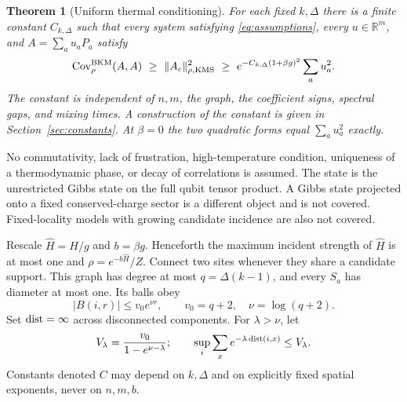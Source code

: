\documentclass[11pt]{article}
\newtheorem{theorem}{Theorem}[section]
\theoremstyle{remark}\newtheorem{remark}[theorem]{Remark}
\newcommand{\kn}[1]{\|#1\|_{\rho,\mathrm{KMS}}}
\newcommand{\R}{\mathbb R}\newcommand{\C}{\mathbb C}
\begin{document}
\begin{theorem}[Uniform thermal conditioning]\label{thm:main}
For each fixed $k,\Delta$ there is a finite constant $C_{k,\Delta}$ such that every system satisfying \eqref{eq:assumptions}, every $u\in\R^m$, and $A=\sum_a u_aP_a$ satisfy
\begin{equation}\label{eq:main}
 \Cov_\rho^{\mathrm{BKM}}(A,A)
 \ \ge\ \kn{A_c}^2
 \ \ge\ e^{-C_{k,\Delta}(1+\beta g)^2}\sum_a u_a^2.
\end{equation}
The constant is independent of $n,m$, the graph, the coefficient signs, spectral gaps, and mixing times. A construction of the constant is given in Section~\ref{sec:constants}. At $\beta=0$ the two quadratic forms equal $\sum_a u_a^2$ exactly.
\end{theorem}

No commutativity, lack of frustration, high-temperature condition, uniqueness of a thermodynamic phase, or decay of correlations is assumed. The state is the unrestricted Gibbs state on the full qubit tensor product. A Gibbs state projected onto a fixed conserved-charge sector is a different object and is not covered. Fixed-locality models with growing candidate incidence are also not covered.

Rescale $\widehat H=H/g$ and $b=\beta g$. Henceforth the maximum incident strength of $\widehat H$ is at most one and $\rho=e^{-b\widehat H}/Z$. Connect two sites whenever they share a candidate support. This graph has degree at most $q=\Delta(k-1)$, and every $S_a$ has diameter at most one. Its balls obey
\begin{equation}\label{eq:volume}
 |B(i,r)|\le v_0e^{\nu r},\qquad v_0=q+2,\quad\nu=\log(q+2).
\end{equation}
Set $\operatorname{dist}=\infty$ across disconnected components. For $\lambda>\nu$, let
\begin{equation}\label{eq:V}
 V_\lambda=\frac{v_0}{1-e^{\nu-\lambda}};
 \qquad \sup_i\sum_x e^{-\lambda\operatorname{dist}(i,x)}\le V_\lambda.
\end{equation}
Constants denoted $C$ may depend on $k,\Delta$ and on explicitly fixed spatial exponents, never on $n,m,b$.
\end{document}
